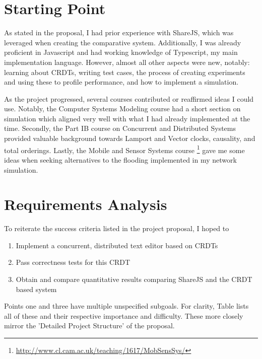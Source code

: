 \documentclass[12pt,a4paper,twoside,openright]{report}
\begin{document}
\section{Starting Point}

As stated in the proposal, I had prior experience with ShareJS, which was leveraged when creating the comparative system. Additionally, I was already proficient in Javascript and had working knowledge of Typescript, my main implementation language. However, almost all other aspects were new, notably: learning about CRDTs, writing test cases, the process of creating experiments and using these to profile performance, and how to implement a simulation.

As the project progressed, several courses contributed or reaffirmed ideas I could use. Notably, the Computer Systems Modeling \cite{compsysmodeling} course had a short section on simulation which aligned very well with what I had already implemented at the time. Secondly, the Part IB course on Concurrent and Distributed Systems \cite{concdistsystems} provided valuable background towards Lamport and Vector clocks, causality, and total orderings. Lastly, the Mobile and Sensor Systems course \footnote{\url{http://www.cl.cam.ac.uk/teaching/1617/MobSensSys/}} gave me some ideas when seeking alternatives to the flooding implemented in my network simulation.

\section{Requirements Analysis}
To reiterate the success criteria listed in the project proposal, I hoped to

\begin{enumerate}
\item Implement a concurrent, distributed text editor based on CRDTs 
\item Pass correctness tests for this CRDT
\item Obtain and compare quantitative results comparing ShareJS and the CRDT based system
\end{enumerate}

Points one and three have multiple unspecified subgoals. For clarity, Table lists all of these and their respective importance and difficulty. These more closely mirror the 'Detailed Project Structure' of the proposal.
\end{document}
